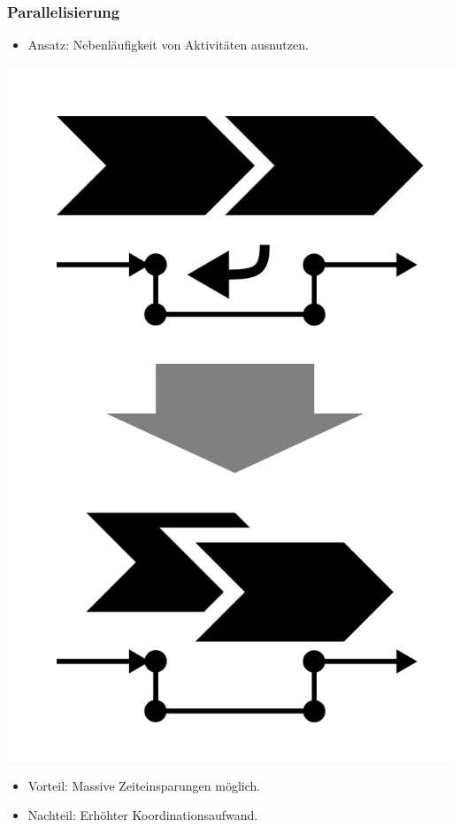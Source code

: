 \documentclass{beamer}
\begin{document}
 \begin{frame}
  \frametitle{Parallelisierung}
   \begin{itemize}
    \item Ansatz: Nebenläufigkeit von Aktivitäten ausnutzen.
   \end{itemize}
  \centerline{\includegraphics[scale=2.5]{4_6_7.png}}
  \begin{itemize}
    \item Vorteil: Massive Zeiteinsparungen möglich.
    \item Nachteil: Erhöhter Koordinationsaufwand.
  \end{itemize}
 \end{frame}
\end{document}
